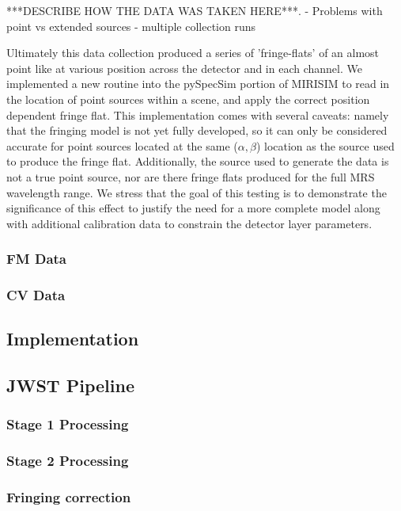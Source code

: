  ***DESCRIBE HOW THE DATA WAS TAKEN HERE***.
 - Problems with point vs extended sources
 - multiple collection runs

\begin{figure}
	\caption{\label{fig:fringeflat}}
\end{figure}
Ultimately this data collection produced a series of 'fringe-flats' of an almost point like at various position across the detector and in each channel.
We implemented a new routine into the pySpecSim portion of MIRISIM to read in the location of point sources within a scene, and apply the correct position dependent fringe flat. 
This implementation comes with several caveats: namely that the fringing model is not yet fully developed, so it can only be considered accurate for point sources located at the same ($\alpha,\beta$) location as the source used to produce the fringe flat. Additionally, the source used to generate the data is not a true point source, nor are there fringe flats produced for the full MRS wavelength range.
We stress that the goal of this testing is to demonstrate the significance of this effect to justify the need for a more complete model along with additional calibration data to constrain the detector layer parameters.
\subsubsection{FM Data}
\subsubsection{CV Data}
\subsection{Implementation}
\subsection{JWST Pipeline}
\subsubsection{Stage 1 Processing}
\subsubsection{Stage 2 Processing}
\subsubsection{Fringing correction}
